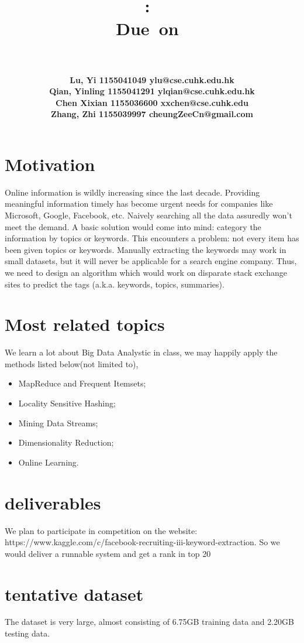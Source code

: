 \documentclass[11pt]{article} %
\title{
\vspace{2in}
\textmd{\textbf{\hmwkClass:\ \hmwkTitle}}\\
\normalsize\vspace{0.1in}\small{Due\ on\ \hmwkDueDate}\\
\vspace{0.1in}\large{\textit{\hmwkClassInstructor\ \hmwkClassTime}}
\vspace{3in}
}
\author{
\textbf{Lu, Yi 1155041049 ylu@cse.cuhk.edu.hk}  \\
\textbf{Qian, Yinling 1155041291 ylqian@cse.cuhk.edu.hk} \\
\textbf{Chen Xixian 1155036600 xxchen@cse.cuhk.edu } \\
\textbf{Zhang, Zhi 1155039997 cheungZeeCn@gmail.com}
}
\date{} %
\begin{document}
\maketitle 

\newpage
\section{Motivation}
Online information is wildly increasing since the last decade. Providing meaningful information timely has become urgent needs for companies like Microsoft, Google, Facebook, etc. Naively searching all the data assuredly won’t meet the demand. A basic solution would come into mind: category the information by topics or keywords. This encounters a problem: not every item has been given topics or keywords. Manually extracting the keywords may work in small datasets, but it will never be applicable for a search engine company. Thus, we need to design an algorithm which would work on disparate stack exchange sites to predict the tags (a.k.a. keywords, topics, summaries).


\section{Most related topics}
We learn a lot about Big Data Analystic in class, we may happily apply the methods listed below(not limited to),
\begin{itemize}
\item MapReduce and Frequent Itemsets;
\item Locality Sensitive Hashing;
\item Mining Data Streams;
\item Dimensionality Reduction;
\item Online Learning.
\end{itemize}
     
\section{deliverables}
We plan to participate in competition on the website: https://www.kaggle.com/c/facebook-recruiting-iii-keyword-extraction. So we would deliver a runnable system and get a rank in top 20

\section{ tentative dataset}
The dataset is very large, almost consisting of 6.75GB training data and 2.20GB testing data.
\end{document}
